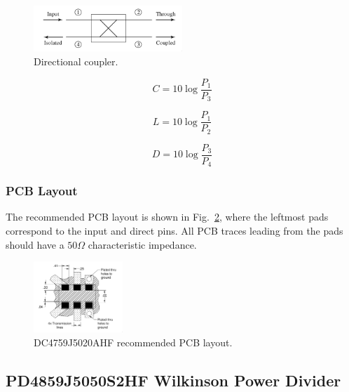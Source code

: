 \begin{figure}[h]
        \centering
        \includegraphics[width=0.5\textwidth]{data/directional-coupler}
        \caption{Directional coupler.}
        \label{fig:directional-coupler}
\end{figure}

\begin{equation}
        \label{eq:coupling-factor}
        C = 10 \log \frac{P_1}{P_3}
\end{equation}

\begin{equation}
        \label{eq:insertion-loss}
        L = 10 \log \frac{P_1}{P_2}
\end{equation}

\begin{equation}
        \label{eq:directivity}
        D = 10 \log \frac{P_3}{P_4}
\end{equation}

\subsubsection{PCB Layout}
\label{sec:dc4759j5020ahf-pcb}

The recommended PCB layout is shown in Fig.~\ref{fig:dc4759j5020ahf-pcb}, where the leftmost pads
correspond to the input and direct pins. All PCB traces leading from the pads should have a $50
\si{\Omega}$ characteristic impedance.

\begin{figure}[h]
        \centering
        \includegraphics[width=0.3\textwidth]{data/dc4759j5020ahf-pcb}
        \caption{DC4759J5020AHF recommended PCB layout.}
        \label{fig:dc4759j5020ahf-pcb}
\end{figure}

\subsection{PD4859J5050S2HF Wilkinson Power Divider}
\label{sec:pd4859j5050s2hf}

